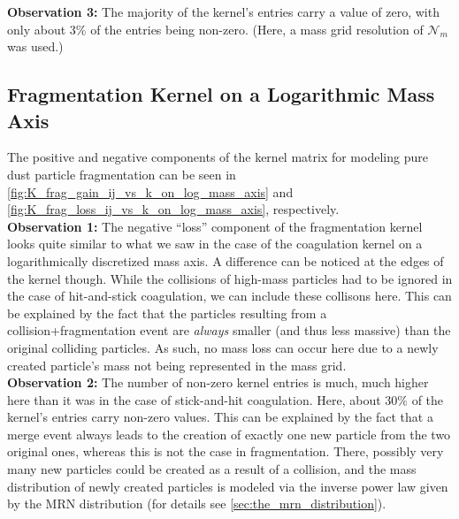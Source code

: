         \textbf{Observation 3:} The majority of the kernel's entries carry a value of zero,
        with only about $3 \%$ of the entries being non-zero. 
        (Here, a mass grid resolution of $\mathcal N_m$ was used.)
       
    \subsection{Fragmentation Kernel on a Logarithmic Mass Axis}

        The positive and negative components of the kernel matrix for modeling pure 
        dust particle fragmentation can be seen in 
        \cref{fig:K_frag_gain_ij_vs_k_on_log_mass_axis} and 
        \cref{fig:K_frag_loss_ij_vs_k_on_log_mass_axis}, respectively. \\


        \textbf{Observation 1:} The negative ``loss'' component of the fragmentation kernel 
        looks quite similar to what we saw in the case of the coagulation kernel on a 
        logarithmically discretized mass axis. A difference can be noticed at the edges 
        of the kernel though. While the collisions of high-mass particles had to be 
        ignored in the case of hit-and-stick coagulation, we can include these collisons
        here. This can be explained by the fact that the particles resulting from a 
        collision+fragmentation event are \textit{always} smaller (and thus less massive) than 
        the original colliding particles. As such, no mass loss can occur here due to a 
        newly created particle's mass not being represented in the mass grid. \\

        \textbf{Observation 2:} The number of non-zero kernel entries is much, much higher 
        here than it was in the case of stick-and-hit coagulation. Here, about $30 \%$ of the 
        kernel's entries carry non-zero values. This can be explained by 
        the fact that a merge event always leads to the creation of exactly one new particle 
        from the two original ones, whereas this is not the case in fragmentation. 
        There, possibly very many new particles could be created as a result of a collision,
        and the mass distribution of newly created particles is modeled via the inverse power 
        law given by the MRN distribution (for details see \cref{sec:the_mrn_distribution}). \\

